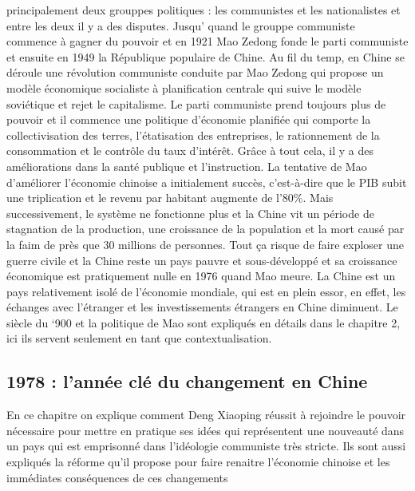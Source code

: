 principalement deux grouppes politiques : les communistes et les nationalistes et entre les deux il y a des disputes. Jusqu’ quand le grouppe communiste commence à gagner du pouvoir et en 1921 Mao Zedong fonde le parti communiste et ensuite en 1949 la République populaire de Chine.  Au fil du temp, en Chine se déroule une révolution communiste conduite par Mao Zedong qui propose un modèle économique socialiste  à planification centrale qui suive le modèle soviétique  et rejet le capitalisme.   Le parti communiste prend toujours plus de pouvoir et il commence une politique d’économie planifiée  qui comporte la collectivisation des terres, l’étatisation des entreprises, le rationnement de la consommation et le contrôle du taux d’intérêt.  Grâce à tout cela, il y a des améliorations dans la santé publique et l’instruction.   La tentative de Mao d’améliorer l’économie chinoise a initialement succès, c’est-à-dire que le PIB subit une triplication et le revenu par habitant augmente de l’80\%.  Mais successivement, le système ne fonctionne plus et  la Chine vit un période de stagnation de la production, une croissance de la population et la mort causé par la faim de près que 30 millions de personnes.  Tout ça risque de faire exploser une guerre civile  et la Chine reste un pays pauvre et sous-développé et sa croissance économique est pratiquement nulle en 1976  quand Mao meure. La Chine est un pays relativement isolé de l’économie mondiale, qui est en plein essor, en effet, les échanges avec l’étranger et les investissements étrangers en Chine diminuent.  
Le siècle du ‘900 et la politique de Mao sont expliqués en détails dans le chapitre 2, ici ils servent seulement en tant que contextualisation. 
\subsection{1978 : l’année clé du changement en Chine}
En ce chapitre on explique comment Deng Xiaoping réussit à rejoindre le pouvoir nécessaire pour mettre en pratique ses idées qui représentent une nouveauté dans un pays qui est emprisonné dans l’idéologie communiste très stricte. Ils sont aussi expliqués la réforme qu’il propose pour faire renaitre l’économie chinoise et les immédiates conséquences de ces changements
